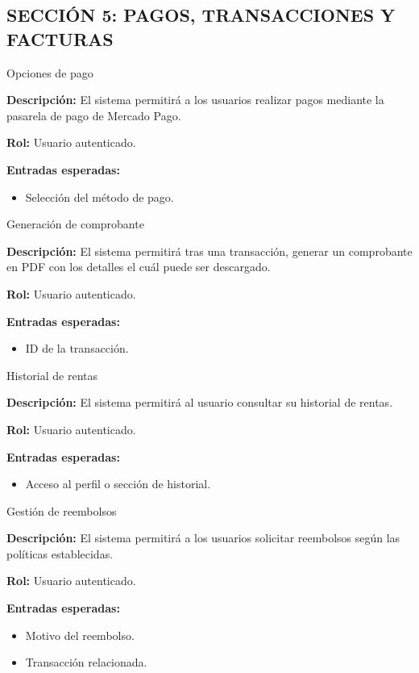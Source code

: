 \subsection*{\uppercase{Sección 5: Pagos, Transacciones y Facturas}}
\begin{requisito}{Opciones de pago}
	\item \textbf{Descripción:} El sistema permitirá a los usuarios realizar pagos mediante la pasarela de pago de Mercado Pago.
	\item \textbf{Rol:} Usuario autenticado.
	\item \textbf{Entradas esperadas:}
	\begin{itemize}
		\item Selección del método de pago.
	\end{itemize}
\end{requisito}
\begin{requisito}{Generación de comprobante}
	\item \textbf{Descripción:} El sistema permitirá tras una transacción, generar un comprobante en PDF con los detalles el cuál puede ser descargado.
	\item \textbf{Rol:} Usuario autenticado.
	\item \textbf{Entradas esperadas:}
	\begin{itemize}
		\item ID de la transacción.
	\end{itemize}
\end{requisito}
\begin{requisito}{Historial de rentas}
	\item \textbf{Descripción:} El sistema permitirá al usuario consultar su historial de rentas.
	\item \textbf{Rol:} Usuario autenticado.
	\item \textbf{Entradas esperadas:}
	\begin{itemize}
		\item Acceso al perfil o sección de historial.
	\end{itemize}
\end{requisito}
\begin{requisito}{Gestión de reembolsos}
	\item \textbf{Descripción:} El sistema permitirá a los usuarios solicitar reembolsos según las políticas establecidas.
	\item \textbf{Rol:} Usuario autenticado.
	\item \textbf{Entradas esperadas:}
	\begin{itemize}
		\item Motivo del reembolso.
		\item Transacción relacionada.
	\end{itemize}
\end{requisito}